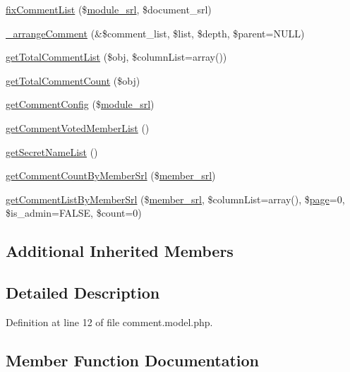 \begin{DoxyCompactItemize}
\hyperlink{classcommentModel_af9457d8f1128af78c79ea416d591fc13}{fix\+Comment\+List} (\$\hyperlink{ko_8install_8php_a370bb6450fab1da3e0ed9f484a38b761}{module\+\_\+srl}, \$document\+\_\+srl)
\item 
\hyperlink{classcommentModel_a47ec9e90b14a5eb6108d22ab50b416d4}{\+\_\+arrange\+Comment} (\&\$comment\+\_\+list, \$list, \$depth, \$parent=N\+U\+LL)
\item 
\hyperlink{classcommentModel_abaac356ea7a0b2720034646c45b567ec}{get\+Total\+Comment\+List} (\$obj, \$column\+List=array())
\item 
\hyperlink{classcommentModel_a1854f15efa75a16e2edd603167d05e93}{get\+Total\+Comment\+Count} (\$obj)
\item 
\hyperlink{classcommentModel_a2e9bab595215a773f55c2400268d5bf6}{get\+Comment\+Config} (\$\hyperlink{ko_8install_8php_a370bb6450fab1da3e0ed9f484a38b761}{module\+\_\+srl})
\item 
\hyperlink{classcommentModel_a06f86d74df8aedbe4a4eba9704fd2d41}{get\+Comment\+Voted\+Member\+List} ()
\item 
\hyperlink{classcommentModel_ad05dafe1e96d761873a0b772eb1f749a}{get\+Secret\+Name\+List} ()
\item 
\hyperlink{classcommentModel_ad724212fb3664eeca8855af5d8944039}{get\+Comment\+Count\+By\+Member\+Srl} (\$\hyperlink{ko_8install_8php_aa61f9e08f0fe505094d26f8143f30bbd}{member\+\_\+srl})
\item 
\hyperlink{classcommentModel_ac5582cb271f13874b4d60a7fafe1f5b7}{get\+Comment\+List\+By\+Member\+Srl} (\$\hyperlink{ko_8install_8php_aa61f9e08f0fe505094d26f8143f30bbd}{member\+\_\+srl}, \$column\+List=array(), \$\hyperlink{classpage}{page}=0, \$is\+\_\+admin=F\+A\+L\+SE, \$count=0)
\end{DoxyCompactItemize}
\subsection*{Additional Inherited Members}


\subsection{Detailed Description}


Definition at line 12 of file comment.\+model.\+php.



\subsection{Member Function Documentation}
